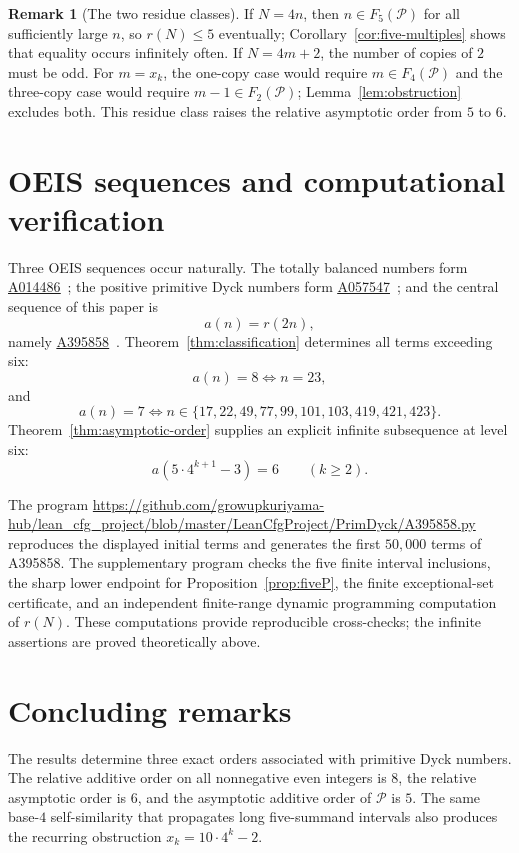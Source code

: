 \documentclass[12pt]{article}
\theoremstyle{plain}
\theoremstyle{definition}
\newtheorem{remark}[theorem]{Remark}
\theoremstyle{plain}
\newcommand{\Pset}{\mathcal{P}}
\newcommand{\seqnum}[1]{\href{https://oeis.org/#1}{\rm \underline{#1}}}
\begin{document}
\begin{remark}[The two residue classes]
If $N=4n$, then $n\in F_5(\Pset)$ for all sufficiently large $n$, so
$r(N)\leq5$ eventually; Corollary~\ref{cor:five-multiples} shows that equality
occurs infinitely often.  If $N=4m+2$, the number of copies of $2$ must be odd.
For $m=x_k$, the one-copy case would require $m\in F_4(\Pset)$ and the
three-copy case would require $m-1\in F_2(\Pset)$; Lemma~\ref{lem:obstruction}
excludes both.  This residue class raises the relative asymptotic order from
$5$ to $6$.
\end{remark}

\section{OEIS sequences and computational verification}
\label{sec:oeis}

Three OEIS sequences occur naturally.  The totally balanced numbers form
\seqnum{A014486}~\cite{OEIS-A014486}; the positive primitive Dyck numbers form
\seqnum{A057547}~\cite{OEIS-A057547}; and the central sequence of this paper is
\[
  a(n)=r(2n),
\]
namely \seqnum{A395858}~\cite{OEIS-A395858}.  Theorem~\ref{thm:classification}
determines all terms exceeding six:
\[
  a(n)=8\iff n=23,
\]
and
\[
  a(n)=7\iff
  n\in\{17,22,49,77,99,101,103,419,421,423\}.
\]
Theorem~\ref{thm:asymptotic-order} supplies an explicit infinite subsequence at
level six:
\begin{equation}\label{eq:A395858-six-subsequence}
  a(5\cdot4^{k+1}-3)=6\qquad(k\geq2).
\end{equation}

The program 
\url{https://github.com/growupkuriyama-hub/lean_cfg_project/blob/master/LeanCfgProject/PrimDyck/A395858.py}
reproduces the displayed initial terms and generates the first $50{,}000$ terms
of A395858.  The supplementary program
 checks the five finite interval
inclusions, the sharp lower endpoint for Proposition~\ref{prop:fiveP}, the
finite exceptional-set certificate, and an independent finite-range dynamic
programming computation of $r(N)$.  These computations provide reproducible
cross-checks; the infinite assertions are proved theoretically above.

\section{Concluding remarks}

The results determine three exact orders associated with primitive Dyck
numbers.  The relative additive order on all nonnegative even integers is
$8$, the relative asymptotic order is $6$, and the asymptotic additive order of
$\Pset$ is $5$.  The same base-$4$ self-similarity that propagates long
five-summand intervals also produces the recurring obstruction
$x_k=10\cdot4^k-2$.
\end{document}
